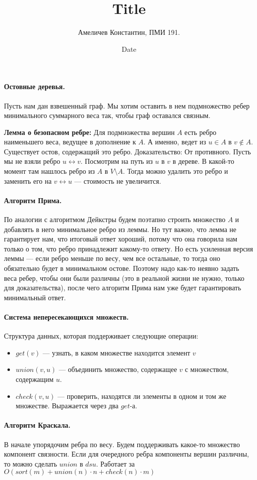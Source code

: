 \documentclass[12pt]{article}
\title{Title}
\author{Амеличев Константин, ПМИ 191.}
\date{Date}
\begin{document}
\paragraph{Остовные деревья.} Пусть нам дан взвешенный граф. Мы хотим оставить в нем подмножество ребер минимального суммарного веса так, чтобы граф оставался связным.

\textbf{Лемма о безопасном ребре:} Для подмножества вершин $A$ есть ребро наименьшего веса, ведущее в дополнение к $A$. А именно, ведет из $u \in A$ в $v \notin A$. Существует остов, содержащий это ребро. Доказательство: От противного. Пусть мы не взяли ребро $u \leftrightarrow v$. Посмотрим на путь из $u$ в $v$ в дереве. В какой-то момент там нашлось ребро из $A$ в $V \setminus A$. Тогда можно удалить это ребро и заменить его на $v \leftrightarrow u$ --- стоимость не увеличится.

\paragraph{Алгоритм Прима.} По аналогии с алгоритмом Дейкстры будем поэтапно строить множество $A$ и добавлять в него минимальное ребро из леммы. Но тут важно, что лемма не гарантирует нам, что итоговый ответ хороший, потому что она говорила нам только о том, что ребро принадлежит какому-то ответу. Но есть усиленная версия леммы --- если ребро меньше по весу, чем все остальные, то тогда оно обязательно будет в минимальном остове. Поэтому надо как-то неявно задать веса ребер, чтобы они были различны (это в реальной жизни не нужно, только для доказательства), после чего алгоритм Прима нам уже будет гарантировать минимальный ответ.

\paragraph{Система непересекающихся множеств.} Структура данных, которая поддерживает следующие операции:

\begin{itemize}
\item $get(v)$ --- узнать, в каком множестве находится элемент $v$
\item $union(v, u)$ --- объединить множество, содержащее $v$ с множеством, содержащим $u$.
\item $check(v, u)$ --- проверить, находятся ли элементы в одном и том же множестве. Выражается через два $get$-а.
\end{itemize}


\paragraph{Алгоритм Краскала.} В начале упорядочим ребра по весу. Будем поддерживать какое-то множество компонент связности. Если для очередного ребра компоненты вершин различны, то можно сделать $union$ в $dsu$. Работает за $O(sort(m) + union(n) \cdot n + check(n) \cdot m)$
\end{document}
